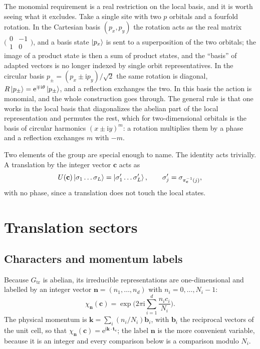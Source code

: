 \documentclass[12pt]{article}
\newcommand{\ee}{\mathrm{e}}
\newcommand{\ii}{\mathrm{i}}
\begin{document}
The monomial requirement is a real restriction on the local basis, and it is worth
seeing what it excludes. Take a single site with two $p$ orbitals and a
fourfold rotation. In the Cartesian basis $(p_x,p_y)$ the rotation acts as the
real matrix $\bigl(\begin{smallmatrix}0&-1\\1&0\end{smallmatrix}\bigr)$, and a basis state
$\ket{p_x}$ is sent to a superposition of the two orbitals; the image of a
product state is then a sum of product states, and the ``basis'' of adapted
vectors is no longer indexed by single orbit representatives. In the circular
basis $p_\pm = (p_x\pm \ii p_y)/\sqrt2$ the same rotation is diagonal,
$R\ket{p_\pm} = \ee^{\mp\ii\theta}\ket{p_\pm}$, and a reflection exchanges the
two. In this basis the action is monomial, and the whole construction goes
through. The general rule is that one works in the local basis that diagonalizes
the abelian part of the local representation and permutes the rest, which for
two-dimensional orbitals is the basis of circular harmonics
$(x\pm\ii y)^m$: a rotation multiplies them by a phase and a reflection exchanges
$m$ with $-m$\cite{tinkham1964}.

Two elements of the group are special enough to name. The identity acts
trivially. A translation by the integer vector $\mathbf{c}$ acts as
\begin{equation}
  U(\mathbf{c})\ket{\sigma_1\dots\sigma_L} = \ket{\sigma'_1\dots\sigma'_L},
  \qquad
  \sigma'_{j} = \sigma_{\pi_{\mathbf{c}}^{-1}(j)},
  \label{eq:translation}
\end{equation}
with no phase, since a translation does not touch the local states.

\section{Translation sectors}\label{sec:momentum}

\subsection{Characters and momentum labels}

Because $G_{\mathrm{tr}}$ is abelian, its irreducible representations are
one-dimensional and labelled by an integer vector $\mathbf{n} = (n_1,\dots,n_d)$
with $n_i = 0,\dots,N_i-1$:
\begin{equation}
  \chi_{\mathbf{n}}(\mathbf{c}) = \exp\biggl(2\pi \ii \sum_{i=1}^{d}
  \frac{n_i c_i}{N_i}\biggr).
  \label{eq:char}
\end{equation}
The physical momentum is $\mathbf{k} = \sum_i (n_i/N_i)\mathbf{b}_i$, with
$\mathbf{b}_i$ the reciprocal vectors of the unit cell, so that
$\chi_{\mathbf{n}}(\mathbf{c}) = \ee^{\ii\mathbf{k}\cdot\mathbf{t}_{\mathbf{c}}}$;
the label $\mathbf{n}$ is the more convenient variable, because it is an integer
and every comparison below is a comparison modulo $N_i$.
\end{document}
